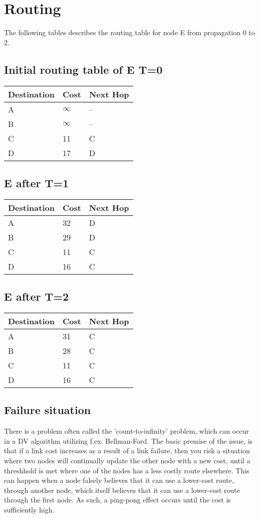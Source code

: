 \section{Routing}
The following tables describes the routing table for
node E from propagation 0 to 2.

\subsection{Initial routing table of E T=0}
\begin{tabular}{| l | l | l |}
    \hline
    Destination & Cost & Next Hop \\ \hline
    A & \cellcolor{red}$\infty$ & -- \\ \hline
    B & \cellcolor{red}$\infty$ & -- \\ \hline
    C & 11 & C \\ \hline
    D & 17 & D \\ \hline
\end{tabular}
\subsection{E after T=1}
\begin{tabular}{| l | l | l |}
    \hline
    Destination & Cost & Next Hop \\ \hline
    A & 32 & D \\ \hline
    B & 29 & D \\ \hline
    C & 11 & C \\ \hline
    D & 16 & C \\ \hline
\end{tabular}
\subsection{E after T=2}
\begin{tabular}{| l | l | l |}
    \hline
    Destination & Cost & Next Hop \\ \hline
    A & 31 & C \\ \hline
    B & 28 & C \\ \hline
    C & 11 & C \\ \hline
    D & 16 & C \\ \hline
\end{tabular}
\subsection{Failure situation}
There is a problem often called the 'count-to-infinity' problem,
which can occur in a DV algorithm utilizing f.ex. Bellman-Ford. The
basic premise of the issue, is that if a link cost increases as a
result of a link failure, then you risk a situation where two nodes
will continually update the other node with a new cost, until a
threshhold is met where one of the nodes has a less costly route
elsewhere. This can happen when a node falsely believes that it can
use a lower-cost route, through another node, which itself believes
that it can use a lower-cost route through the first node. As such,
a ping-pong effect occurs until the cost is sufficiently high.

